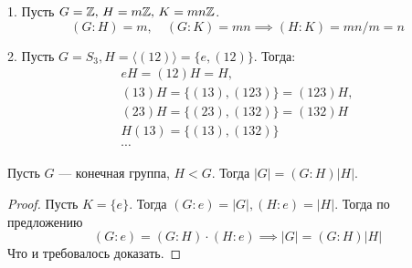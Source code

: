 \documentclass[../main.tex]{subfiles}
\begin{document}
\begin{examples}
    1. Пусть $G = \mathbb{Z},\, H = m\mathbb{Z},\, K = mn\mathbb{Z}$.
    \begin{equation*}
        (G : H) = m, \quad (G : K) = mn \implies (H : K) = mn/m = n
    \end{equation*}

    2. Пусть $G = S_3, H = \langle (1 2) \rangle = \{e, (1 2)\}$. Тогда:
    \begin{equation*}
        \begin{gathered}
            eH = (1 2)H = H,\\
            (1 3)H = \{(1 3), (1 2 3)\} = (1 2 3)H,\\
            (2 3)H = \{(2 3), (1 3 2)\} = (1 3 2)H\\
            H(1 3) = \{(1 3), (1 3 2)\}\\
            \cdots
        \end{gathered}
    \end{equation*}
\end{examples}

\begin{corollary*}
    Пусть $G$ --- конечная группа, $H < G$. Тогда $|G| = (G : H)|H|$.
\end{corollary*}
\begin{proof}
    Пусть $K = \{e\}$. Тогда $(G : e) = |G|, (H : e) = |H|$. Тогда по предложению
    \begin{equation*}
        (G : e) = (G : H) \cdot (H : e) \implies |G| = (G : H)|H|
    \end{equation*}
    Что и требовалось доказать.
\end{proof}
\end{document}
